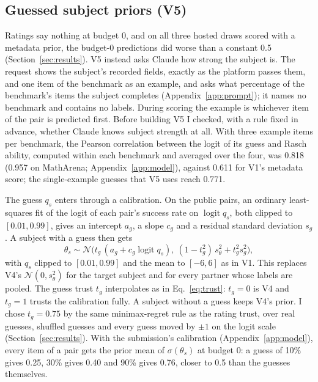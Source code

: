 \subsection{Guessed subject priors (V5)}
Ratings say nothing at budget 0, and on all three hosted draws scored with a metadata prior, the budget-0 predictions did worse than a constant 0.5 (Section~\ref{sec:results}). V5 instead asks Claude how strong the subject is. The request shows the subject's recorded fields, exactly as the platform passes them, and one item of the benchmark as an example, and asks what percentage of the benchmark's items the subject completes (Appendix~\ref{app:prompt}); it names no benchmark and contains no labels. During scoring the example is whichever item of the pair is predicted first. Before building V5 I checked, with a rule fixed in advance, whether Claude knows subject strength at all. With three example items per benchmark, the Pearson correlation between the logit of its guess and Rasch ability, computed within each benchmark and averaged over the four, was 0.818 (0.957 on MathArena; Appendix~\ref{app:model}), against 0.611 for V1's metadata score; the single-example guesses that V5 uses reach 0.771.

The guess $q_s$ enters through a calibration. On the public pairs, an ordinary least-squares fit of the logit of each pair's success rate on $\operatorname{logit} q_s$, both clipped to $[0.01, 0.99]$, gives an intercept $a_g$, a slope $c_g$ and a residual standard deviation $s_g$. A subject with a guess then gets
\begin{equation}
  \theta_s \sim \mathcal{N}\bigl(t_g\,(a_g + c_g \operatorname{logit} q_s),\ (1 - t_g^2)\,s_\theta^2 + t_g^2 s_g^2\bigr),
  \label{eq:guessprior}
\end{equation}
with $q_s$ clipped to $[0.01, 0.99]$ and the mean to $[-6, 6]$ as in V1. This replaces V4's $\mathcal{N}(0, s_\theta^2)$ for the target subject and for every partner whose labels are pooled. The guess trust $t_g$ interpolates as in Eq.~\eqref{eq:trust}: $t_g = 0$ is V4 and $t_g = 1$ trusts the calibration fully. A subject without a guess keeps V4's prior. I chose $t_g = 0.75$ by the same minimax-regret rule as the rating trust, over real guesses, shuffled guesses and every guess moved by $\pm 1$ on the logit scale (Section~\ref{sec:results}). With the submission's calibration (Appendix~\ref{app:model}), every item of a pair gets the prior mean of $\sigma(\theta_s)$ at budget 0: a guess of 10\% gives 0.25, 30\% gives 0.40 and 90\% gives 0.76, closer to 0.5 than the guesses themselves.
